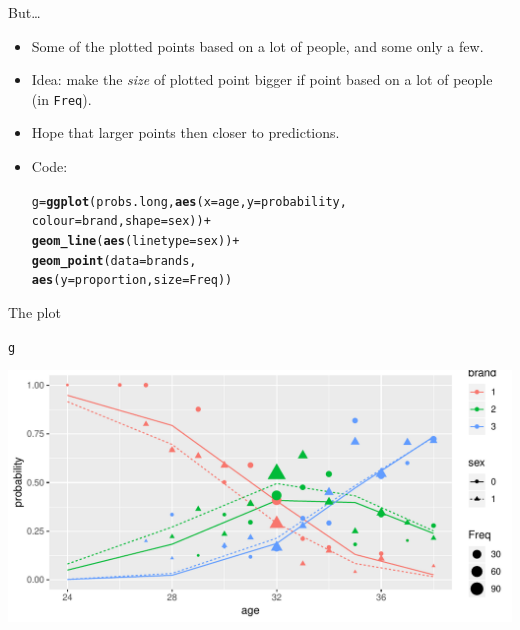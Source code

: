 \documentclass[unknownkeysallowed]{beamer}\usepackage[]{graphicx}\usepackage[]{color}
\makeatletter
\def\maxwidth{ %
  \ifdim\Gin@nat@width>\linewidth
    \linewidth
  \else
    \Gin@nat@width
  \fi
}
\newcommand{\hlopt}[1]{\textcolor[rgb]{0,0,0}{#1}}%
\newcommand{\hlstd}[1]{\textcolor[rgb]{0.345,0.345,0.345}{#1}}%
\newcommand{\hlkwb}[1]{\textcolor[rgb]{0.69,0.353,0.396}{#1}}%
\newcommand{\hlkwc}[1]{\textcolor[rgb]{0.333,0.667,0.333}{#1}}%
\newcommand{\hlkwd}[1]{\textcolor[rgb]{0.737,0.353,0.396}{\textbf{#1}}}%
\newenvironment{kframe}{%
 \def\at@end@of@kframe{}%
 \ifinner\ifhmode%
  \def\at@end@of@kframe{\end{minipage}}%
  \begin{minipage}{\columnwidth}%
 \fi\fi%
 \def\FrameCommand##1{\hskip\@totalleftmargin \hskip-\fboxsep
 \colorbox{shadecolor}{##1}\hskip-\fboxsep
     \hskip-\linewidth \hskip-\@totalleftmargin \hskip\columnwidth}%
 \MakeFramed {\advance\hsize-\width
   \@totalleftmargin\z@ \linewidth\hsize
   \@setminipage}}%
 {\par\unskip\endMakeFramed%
 \at@end@of@kframe}
\newenvironment{knitrout}{}{} %
\makeatother
\begin{document}
\begin{frame}[fragile]{But\ldots}
  
  \begin{itemize}
  \item Some of the plotted points based on a lot of people, and some
    only a few.
  \item Idea: make the \emph{size} of plotted point bigger if point
    based on a lot of people (in \texttt{Freq}).
  \item Hope that larger points then closer to predictions.
    
  \item Code:
    
\begin{knitrout}
\color{fgcolor}\begin{kframe}
\begin{alltt}
\hlstd{g}\hlkwb{=}\hlkwd{ggplot}\hlstd{(probs.long,}\hlkwd{aes}\hlstd{(}\hlkwc{x}\hlstd{=age,}\hlkwc{y}\hlstd{=probability,}
  \hlkwc{colour}\hlstd{=brand,}\hlkwc{shape}\hlstd{=sex))}\hlopt{+}
  \hlkwd{geom_line}\hlstd{(}\hlkwd{aes}\hlstd{(}\hlkwc{linetype}\hlstd{=sex))}\hlopt{+}
  \hlkwd{geom_point}\hlstd{(}\hlkwc{data}\hlstd{=brands,}
             \hlkwd{aes}\hlstd{(}\hlkwc{y}\hlstd{=proportion,}\hlkwc{size}\hlstd{=Freq))}
\end{alltt}
\end{kframe}
\end{knitrout}
  \end{itemize}
  
\end{frame}

\begin{frame}[fragile]{The plot}
  
\begin{knitrout}
\color{fgcolor}\begin{kframe}
\begin{alltt}
\hlstd{g}
\end{alltt}
\end{kframe}
\includegraphics[width=\maxwidth]{figure/unnamed-chunk-118-1} 

\end{knitrout}
  
\end{frame}
\end{document}
